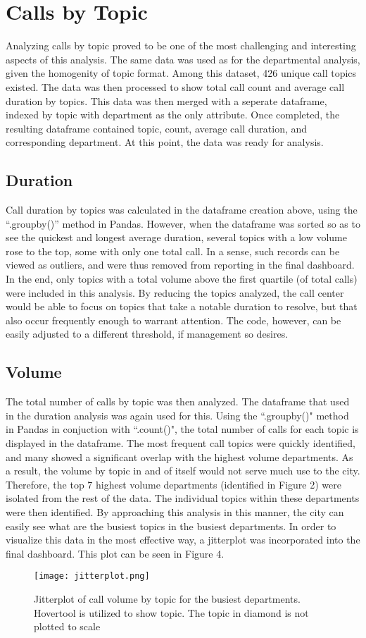 \documentclass[11pt,twocolumn]{article}
\begin{document}
\section{Calls by Topic}
Analyzing calls by topic proved to be one of the most challenging and interesting aspects of this analysis.  The same data was used as for the departmental analysis, given the homogenity of topic format.  Among this dataset, 426 unique call topics existed.  The data was then processed to show total call count and average call duration by topics.  This data was then merged with a seperate dataframe, indexed by topic with department as the only attribute.  Once completed, the resulting dataframe contained topic, count, average call duration, and corresponding department.  At this point, the data was ready for analysis.

\subsection{Duration}
Call duration by topics was calculated in the dataframe creation above, using the ``.groupby()'' method in Pandas.  However, when the dataframe was sorted so as to see the quickest and longest average duration, several topics with a low volume rose to the top, some with only one total call.  In a sense, such records can be viewed as outliers, and were thus removed from reporting in the final dashboard.  In the end, only topics with a total volume above the first quartile (of total calls) were included in this analysis.  By reducing the topics analyzed, the call center would be able to focus on topics that take a notable duration to resolve, but that also occur frequently enough to warrant attention.  The code, however, can be easily adjusted to a different threshold, if management so desires.

\subsection{Volume}
The total number of calls by topic was then analyzed.  The dataframe that used in the duration analysis was again used for this.  Using the ``.groupby()" method in Pandas in conjuction with ``.count()", the total number of calls for each topic is displayed in the dataframe.  The most frequent call topics were quickly identified, and many showed a significant overlap with the highest volume departments.  As a result, the volume by topic in and of itself would not serve much use to the city.  Therefore, the top 7 highest volume departments (identified in Figure 2) were isolated from the rest of the data.  The individual topics within these departments were then identified.  By approaching this analysis in this manner, the city can easily see what are the busiest topics in the busiest departments.  In order to visualize this data in the most effective way, a jitterplot was incorporated into the final dashboard.  This plot can be seen in Figure 4.
\begin{figure}[h]
  \texttt{[image: jitterplot.png]}
  \caption{Jitterplot of call volume by topic for the busiest departments.  Hovertool is utilized to show topic.  The topic in diamond is not plotted to scale}
\end{figure}
\end{document}
